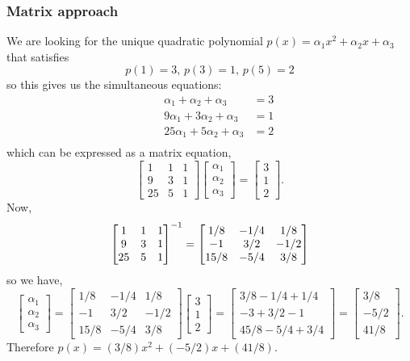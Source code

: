 \documentclass[MathsNotesBase.tex]{subfiles}
\begin{document}
{	\subsubsection{Matrix approach}
	\bigskip
	We are looking for the unique quadratic polynomial ${ p(x) = \alpha_1x^2 + \alpha_2x + \alpha_3 }$ that satisfies
	\[ p(1)=3,\, p(3)=1,\, p(5)=2 \]
	so this gives us the simultaneous equations:
	\begin{align*}
	&& \alpha_1 + \alpha_2 + \alpha_3 &= 3 \\
	&& 9\alpha_1 + 3\alpha_2 + \alpha_3 &= 1 \\
	&& 25\alpha_1 + 5\alpha_2 + \alpha_3 &= 2 \\
	\end{align*}
	which can be expressed as a matrix equation,
	\[ 
		\begin{bmatrix}
		1 & 1 & 1\\
		9 & 3 & 1\\
		25 & 5 & 1
		\end{bmatrix}
		\begin{bmatrix}\alpha_1\\\alpha_2\\\alpha_3\end{bmatrix} 
		=
		\begin{bmatrix}3\\1\\2\end{bmatrix}.
	\]
	Now,
	\[ 
		{\begin{bmatrix}
			1 & 1 & 1\\
			9 & 3 & 1\\
			25 & 5 & 1
			\end{bmatrix}}^{-1} 
		=
		\begin{bmatrix}
		1/8  & -1/4 & 1/8\\
		-1   & 3/2  & -1/2\\
		15/8 & -5/4 & 3/8
		\end{bmatrix}
	\]
	so we have,
	\[
		 \begin{bmatrix}\alpha_1\\\alpha_2\\\alpha_3\end{bmatrix} 
		 =
		 \begin{bmatrix}
		 1/8  & -1/4 & 1/8\\
		 -1   & 3/2  & -1/2\\
		 15/8 & -5/4 & 3/8
		 \end{bmatrix}
		 \begin{bmatrix}3\\1\\2\end{bmatrix}
		 =
		 \begin{bmatrix}
		 3/8 - 1/4 + 1/4\\
		 -3 + 3/2 - 1\\
		 45/8 - 5/4 + 3/4
		 \end{bmatrix}
		 =
		 \begin{bmatrix}3/8\\-5/2\\41/8\end{bmatrix}.
	\]
	Therefore ${ p(x) = (3/8)x^2 + (-5/2)x + (41/8) }$.
	
}
\end{document}

